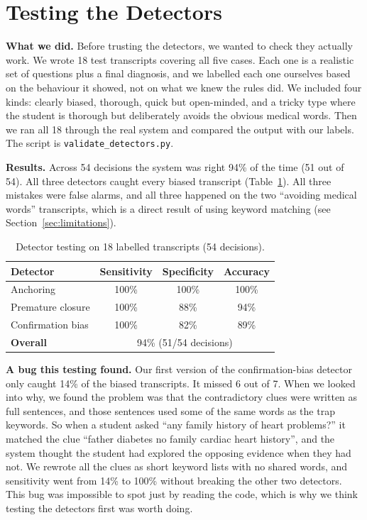 \documentclass[conference]{IEEEtran}
\begin{document}
\section{Testing the Detectors}
\label{sec:validation}
\textbf{What we did.} Before trusting the detectors, we wanted to check they
actually work. We wrote 18 test transcripts covering all five cases. Each one is
a realistic set of questions plus a final diagnosis, and we labelled each one
ourselves based on the behaviour it showed, not on what we knew the rules did. We
included four kinds: clearly biased, thorough, quick but open-minded, and a
tricky type where the student is thorough but deliberately avoids the obvious
medical words. Then we ran all 18 through the real system and compared the
output with our labels. The script is \texttt{validate\_detectors.py}.

\textbf{Results.} Across 54 decisions the system was right 94\% of the time
(51 out of 54). All three detectors caught every biased transcript
(Table~\ref{tab:validation}). All three mistakes were false alarms, and all three
happened on the two ``avoiding medical words'' transcripts, which is a direct
result of using keyword matching (see Section~\ref{sec:limitations}).

\begin{table}[t]
\caption{Detector testing on 18 labelled transcripts (54 decisions).}
\label{tab:validation}
\centering
\small
\begin{tabular}{@{}lccc@{}}
\toprule
\textbf{Detector} & \textbf{Sensitivity} & \textbf{Specificity} & \textbf{Accuracy} \\
\midrule
Anchoring          & 100\% & 100\% & 100\% \\
Premature closure  & 100\% & 88\%  & 94\%  \\
Confirmation bias  & 100\% & 82\%  & 89\%  \\
\midrule
\textbf{Overall}   & \multicolumn{3}{c}{94\% (51/54 decisions)} \\
\bottomrule
\end{tabular}
\end{table}

\textbf{A bug this testing found.} Our first version of the confirmation-bias
detector only caught 14\% of the biased transcripts. It missed 6 out of 7. When
we looked into why, we found the problem was that the contradictory clues were
written as full sentences, and those sentences used some of the same words as the
trap keywords. So when a student asked ``any family history of heart problems?''
it matched the clue ``father diabetes no family cardiac heart history'', and the
system thought the student had explored the opposing evidence when they had not.
We rewrote all the clues as short keyword lists with no shared words, and
sensitivity went from 14\% to 100\% without breaking the other two detectors.
This bug was impossible to spot just by reading the code, which is why we think
testing the detectors first was worth doing.
\end{document}

